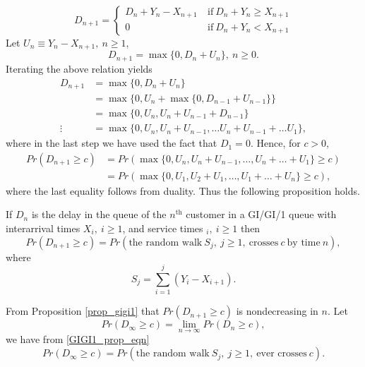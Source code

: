 \documentclass[a4paper,10pt,english]{article}
\begin{document}
\begin{displaymath}
   D_{n+1} = \left\{
     \begin{array}{lr}
       D_n+Y_n-X_{n+1} & ~\text{if}~ D_n+Y_n \geq X_{n+1} \\
       0 & ~\text{if}~ D_n+Y_n <X_{n+1}
     \end{array}
   \right.
\end{displaymath}
Let $U_n \equiv Y_n-X_{n+1},~ n \geq 1$,
\begin{equation*}
D_{n+1}=\max\{0,D_n+U_n\},~ n \geq 0.
\end{equation*}
Iterating the above relation yields
\begin{eqnarray*}
D_{n+1}&=\max\{0,D_n+U_n\}\\
&=\max\{0,U_n+\max\{0,D_{n-1}+U_{n-1}\}\}\\
&=\max\{0,U_n,U_n+U_{n-1}+D_{n-1}\}\\
\vdots
&=\max\{0,U_n,U_n+U_{n-1}, \hdots U_n+U_{n-1}+\hdots U_1\},
\end{eqnarray*}
where in the last step we have used the fact that $D_1=0$. Hence, for $c>0$,
\begin{eqnarray*}
Pr(D_{n+1} \geq c )&=Pr(\max\{0,U_n,U_n+U_{n-1}, \hdots , U_n+ \hdots +U_1\} \geq c)\\
&=Pr(\max\{0,U_1,U_2+U_{1}, \hdots , U_1+ \hdots +U_n\} \geq c),
\end{eqnarray*}
where the last equality follows from duality. Thus the following proposition holds.
\begin{prop}
\label{prop_gigi1}
If $D_n$ is the delay in the queue of the $n^\text{th}$ customer in a GI/GI/1 queue with interarrival times $X_i,~ i \geq 1$, and service times $_i,~ i \geq 1$ then
\begin{equation}
\label{GIGI1_prop_eqn}
Pr(D_{n+1} \geq c) = Pr(\text{the random walk}~ S_j,~ j \geq 1,~\text{crosses}~ c~ \text{by time}~ n ),
\end{equation}
where 
\begin{equation*}
S_j=\sum_{i=1}^{j}(Y_i-X_{i+1}).
\end{equation*}
\end{prop}
From Proposition \ref{prop_gigi1} that $Pr(D_{n+1} \geq c)$ is nondecreasing in $n$. Let
\begin{equation*}
Pr(D_{\infty} \geq c)=\lim_{n \rightarrow \infty}Pr(D_{n} \geq c),
\end{equation*}
we have from \ref{GIGI1_prop_eqn}
\begin{equation}
\label{random_walk_gigi1}
Pr(D_{\infty} \geq c) = Pr(\text{the random walk}~ S_j,~ j \geq 1,~\text{ever crosses}~ c).
\end{equation}
\end{document}
